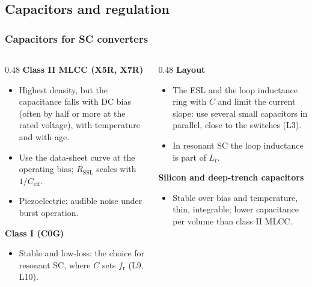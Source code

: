 \subsection{Capacitors and regulation}

\begin{frame}
	\frametitle{Capacitors for SC converters}
	\begin{columns}[T]
		\begin{column}{0.48\textwidth}
			\small
			\textbf{Class II MLCC (X5R, X7R)}
			\begin{itemize}
				\item Highest density, but the capacitance falls with DC bias (often by half or more at the rated voltage), with temperature and with age.
				\item Use the data-sheet curve at the operating bias; $R_\mathrm{SSL}$ scales with $1/C_\mathrm{eff}$.
				\item Piezoelectric: audible noise under burst operation.
			\end{itemize}
			\textbf{Class I (C0G)}
			\begin{itemize}
				\item Stable and low-loss: the choice for resonant SC, where $C$ sets $f_\mathrm{r}$ (L9, L10).
			\end{itemize}
		\end{column}
		\begin{column}{0.48\textwidth}
			\small
			\textbf{Layout}
			\begin{itemize}
				\item The ESL and the loop inductance ring with $C$ and limit the current slope: use several small capacitors in parallel, close to the switches (L3).
				\item In resonant SC the loop inductance is part of $L_\mathrm{r}$.
			\end{itemize}
			\textbf{Silicon and deep-trench capacitors}
			\begin{itemize}
				\item Stable over bias and temperature, thin, integrable; lower capacitance per volume than class II MLCC.
			\end{itemize}
		\end{column}
	\end{columns}
\end{frame}

